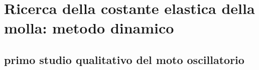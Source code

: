 \section{Ricerca della costante elastica della molla: metodo dinamico}

\subsection{primo studio qualitativo del moto oscillatorio}